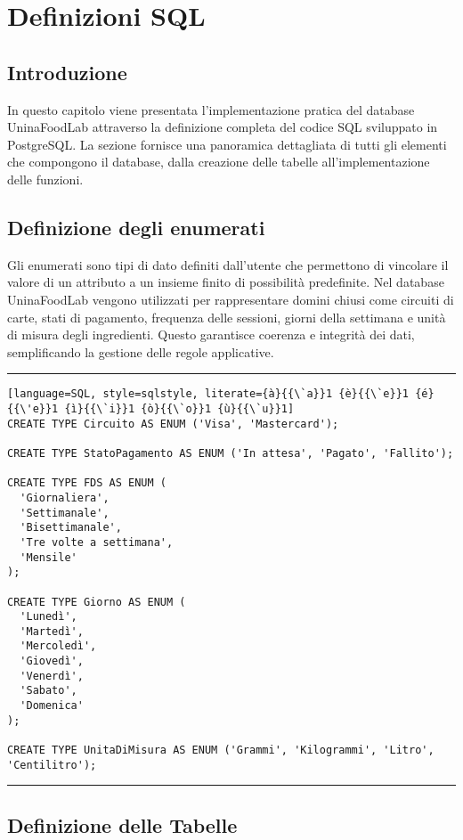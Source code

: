 \section{Definizioni SQL}

\subsection{Introduzione}

In questo capitolo viene presentata l'implementazione pratica del database UninaFoodLab attraverso la definizione completa del codice SQL sviluppato in PostgreSQL. La sezione fornisce una panoramica dettagliata di tutti gli elementi che compongono il database, dalla creazione delle tabelle all'implementazione delle funzioni.


\subsection{Definizione degli enumerati}

Gli enumerati sono tipi di dato definiti dall’utente che permettono di vincolare il valore di un attributo a un insieme finito di possibilità predefinite. Nel database UninaFoodLab vengono utilizzati per rappresentare domini chiusi come circuiti di carte, stati di pagamento, frequenza delle sessioni, giorni della settimana e unità di misura degli ingredienti. Questo garantisce coerenza e integrità dei dati, semplificando la gestione delle regole applicative.

\noindent\rule{\textwidth}{0.4pt}
\begin{lstlisting}[language=SQL, style=sqlstyle, literate={à}{{\`a}}1 {è}{{\`e}}1 {é}{{\'e}}1 {ì}{{\`i}}1 {ò}{{\`o}}1 {ù}{{\`u}}1]
CREATE TYPE Circuito AS ENUM ('Visa', 'Mastercard');

CREATE TYPE StatoPagamento AS ENUM ('In attesa', 'Pagato', 'Fallito');

CREATE TYPE FDS AS ENUM (
  'Giornaliera',
  'Settimanale',
  'Bisettimanale',
  'Tre volte a settimana',
  'Mensile'
);

CREATE TYPE Giorno AS ENUM (
  'Lunedì',
  'Martedì',
  'Mercoledì',
  'Giovedì',
  'Venerdì',
  'Sabato',
  'Domenica'
);

CREATE TYPE UnitaDiMisura AS ENUM ('Grammi', 'Kilogrammi', 'Litro', 'Centilitro');
\end{lstlisting}
\noindent\rule{\textwidth}{0.4pt}

\subsection{Definizione delle Tabelle}


